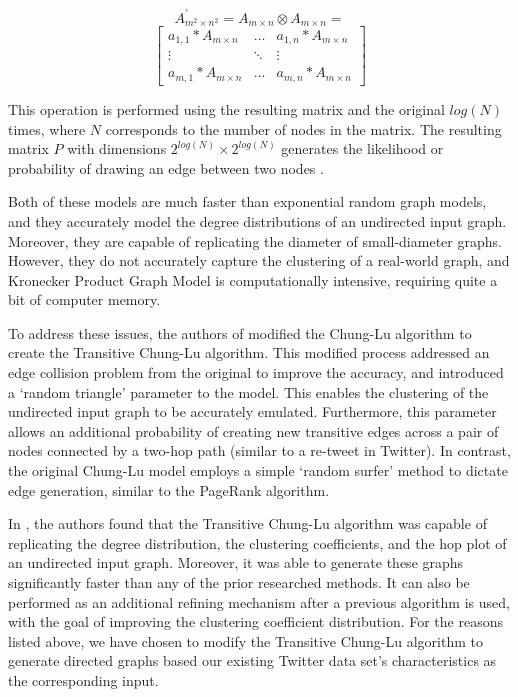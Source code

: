 \documentclass[pdftex,11pt,a4paper,twocolumn]{scrartcl}
\begin{document}
\tiny
\begin{equation*}
A^{\prime}_{m^2\times n^2} = A_{m\times n} \otimes A_{m\times n} =
\end{equation*}
\begin{equation*}
    \begin{bmatrix}
       a_{1,1}*A_{m\times n} & \dots & a_{1,n}*A_{m\times n} \\[0.3em]
       \vdots & \ddots  & \vdots \\[0.3em]
        a_{m,1}*A_{m\times n} & \dots & a_{m,n}*A_{m\times n}
     \end{bmatrix}
\end{equation*}

\normalsize

This operation is performed using the resulting matrix and the original $log(N)$ times, where $N$ corresponds to the number of nodes in the matrix. The resulting matrix $P$ with dimensions $2^{log(N)}\times 2^{log(N)}$ generates the likelihood or probability of drawing an edge between two nodes \cite{fgls}.
 
Both of these models are much faster than exponential random graph models, and they accurately model the degree distributions of an undirected input graph. Moreover, they are capable of replicating the diameter of small-diameter graphs. However, they do not accurately capture the clustering of a real-world graph, and Kronecker Product Graph Model is computationally intensive, requiring quite a bit of computer memory.

To address these issues, the authors of \cite{fgls} modified the Chung-Lu algorithm to create the Transitive Chung-Lu algorithm. This modified process addressed an edge collision problem from the original to improve the accuracy, and introduced a `random triangle' parameter to the model. This enables the clustering of the undirected input graph to be accurately emulated. Furthermore, this parameter allows an additional probability of creating new transitive edges across a pair of nodes connected by a two-hop path (similar to a re-tweet in Twitter). In contrast, the original Chung-Lu model employs a simple `random surfer' method to dictate edge generation, similar to the PageRank algorithm. 

In \cite{fgls}, the authors found that the Transitive Chung-Lu algorithm was capable of replicating the degree distribution, the clustering coefficients, and the hop plot of an undirected input graph. Moreover, it was able to generate these graphs significantly faster than any of the prior researched methods. It can also be performed as an additional refining mechanism after a previous algorithm is used, with the goal of improving the clustering coefficient distribution. For the reasons listed above, we have chosen to modify the Transitive Chung-Lu algorithm to generate directed graphs based our existing Twitter data set's characteristics as the corresponding input.
\end{document}
